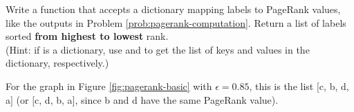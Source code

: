 \begin{problem}
Write a function that accepts a dictionary mapping labels to PageRank values, like the outputs in Problem \ref{prob:pagerank-computation}.
Return a list of labels sorted \textbf{from highest to lowest} rank.
\\(Hint: if  is a dictionary, use  and  to get the list of keys and values in the dictionary, respectively.)

For the graph in Figure \ref{fig:pagerank-basic} with $\epsilon=0.85$, this is the list $[$c, b, d, a$]$ (or $[$c, d, b, a$]$, since b and d have the same PageRank value).
\label{prob:pagerank-ranking}
\end{problem}

\begin{comment}
Looking at Figure \ref{fig:pagerank-nosinks}, it is easy to see why a has the lowest PageRank value: the only other node that points to it is b.
It also makes sense that c has the highest ranking, since c and d both have edges from the other three nodes pointing to them, but d only has one edge (pointing to c), while c points to both b and d.
In other words, at each step d distributes all of its importance to c, while c splits its importance between b and d.

Of course, constructing rankings is much more difficult to do by hand when there are more than just a few nodes in the graph.
\end{comment}


